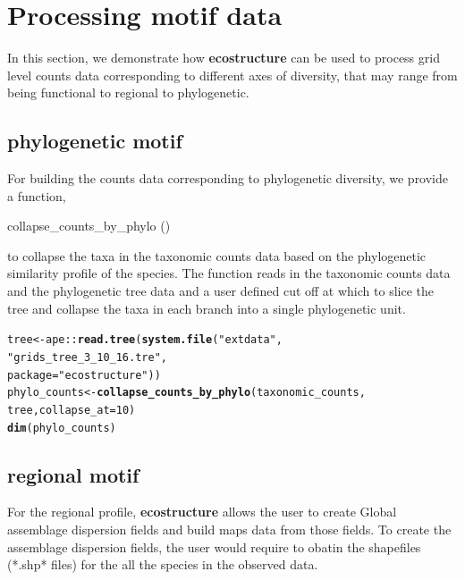 \documentclass[12pt]{article}\usepackage[]{graphicx}\usepackage[usenames,dvipsnames]{color}
\makeatletter
\newcommand{\hlnum}[1]{\textcolor[rgb]{0.686,0.059,0.569}{#1}}%
\newcommand{\hlstr}[1]{\textcolor[rgb]{0.192,0.494,0.8}{#1}}%
\newcommand{\hlopt}[1]{\textcolor[rgb]{0,0,0}{#1}}%
\newcommand{\hlstd}[1]{\textcolor[rgb]{0.345,0.345,0.345}{#1}}%
\newcommand{\hlkwb}[1]{\textcolor[rgb]{0.69,0.353,0.396}{#1}}%
\newcommand{\hlkwc}[1]{\textcolor[rgb]{0.333,0.667,0.333}{#1}}%
\newcommand{\hlkwd}[1]{\textcolor[rgb]{0.737,0.353,0.396}{\textbf{#1}}}%
\newenvironment{kframe}{%
 \def\at@end@of@kframe{}%
 \ifinner\ifhmode%
  \def\at@end@of@kframe{\end{minipage}}%
  \begin{minipage}{\columnwidth}%
 \fi\fi%
 \def\FrameCommand##1{\hskip\@totalleftmargin \hskip-\fboxsep
 \colorbox{shadecolor}{##1}\hskip-\fboxsep
     \hskip-\linewidth \hskip-\@totalleftmargin \hskip\columnwidth}%
 \MakeFramed {\advance\hsize-\width
   \@totalleftmargin\z@ \linewidth\hsize
   \@setminipage}}%
 {\par\unskip\endMakeFramed%
 \at@end@of@kframe}
\newenvironment{knitrout}{}{} %
\makeatother
\begin{document}
\section{Processing motif data}

In this section, we demonstrate how \textbf{ecostructure} can be used to process
grid level counts data corresponding to different axes of diversity, that may range from being functional to regional to phylogenetic.

\subsection{phylogenetic motif}

For building the counts data corresponding to phylogenetic diversity, we provide a function,
\begin{verb} collapse_counts_by_phylo () \end{verb} to collapse the taxa in the taxonomic counts data based on the phylogenetic similarity profile of the species.
The function reads in the taxonomic counts data and the phylogenetic tree data and a user defined cut off at which to slice the tree and collapse the taxa in each branch into a single phylogenetic unit.

\begin{knitrout}
\color{fgcolor}\begin{kframe}
\begin{alltt}
\hlstd{tree} \hlkwb{<-} \hlstd{ape}\hlopt{::}\hlkwd{read.tree}\hlstd{(}\hlkwd{system.file}\hlstd{(}\hlstr{"extdata"}\hlstd{,}
                                   \hlstr{"grids_tree_3_10_16.tre"}\hlstd{,}
                                    \hlkwc{package} \hlstd{=} \hlstr{"ecostructure"}\hlstd{))}
\hlstd{phylo_counts} \hlkwb{<-} \hlkwd{collapse_counts_by_phylo}\hlstd{(taxonomic_counts,}
                                         \hlstd{tree,} \hlkwc{collapse_at} \hlstd{=} \hlnum{10}\hlstd{)}
\hlkwd{dim}\hlstd{(phylo_counts)}
\end{alltt}
\end{kframe}
\end{knitrout}

\subsection{regional motif}

For the regional profile, \textbf{ecostructure} allows the user to create Global assemblage dispersion fields and build maps data from those fields. To create the assemblage dispersion fields, the user would require to obatin the shapefiles (*.shp* files) for the all the species in the observed data.
\end{document}
